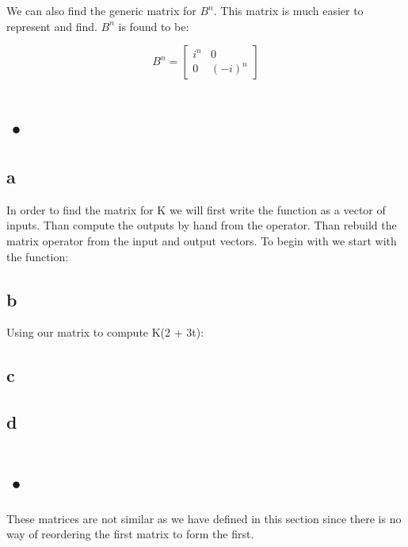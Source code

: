 \documentclass[12pt]{article}
\begin{document}
We can also find the generic matrix for $B^{n}$. This matrix is much easier to represent and find. $B^{n}$ is found to be:

\[
B^{n} =
\begin{bmatrix}
i^{n} & 0\\
0 & (-i)^{n}
\end{bmatrix}
\]

\section{•}
\subsection*{a}
In order to find the matrix for K we will first write the function as a vector of inputs. Than compute the outputs by hand from the operator. Than rebuild the matrix operator from the input and output vectors. To begin with we start with the function:
\subsection*{b}
Using our matrix to compute K(2 + 3t):

\subsection*{c}
\subsection*{d}

\section{•}
These matrices are not similar as we have defined in this section since there is no way of reordering the first matrix to form the first.
\end{document}
